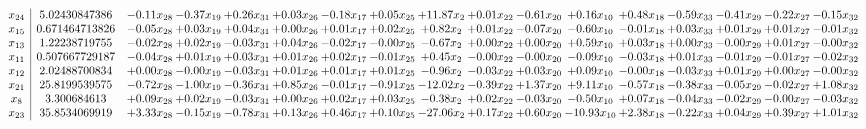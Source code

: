 \documentclass[9pt]{article}
\begin{document}
 \[\begin{array}{c| c c@{\hskip 2pt} c@{\hskip 2pt} c@{\hskip 2pt} c@{\hskip 2pt} c@{\hskip 2pt} c@{\hskip 2pt} c@{\hskip 2pt} c@{\hskip 2pt} c@{\hskip 2pt} c@{\hskip 2pt} c@{\hskip 2pt} c@{\hskip 2pt} c@{\hskip 2pt} c@{\hskip 2pt} c@{\hskip 2pt} }
 x_{24}   &  5.02430847386 & -0.11 x_{28} & -0.37 x_{19} & +  0.26 x_{31} & +  0.03 x_{26} & -0.18 x_{17} & +  0.05 x_{25} & + 11.87 x_{2} & +  0.01 x_{22} & -0.61 x_{20} & +  0.16 x_{10} & +  0.48 x_{18} & -0.59 x_{33} & -0.41 x_{29} & -0.22 x_{27} & -0.15 x_{32}\\
 x_{15}   &  0.671464713826 & -0.05 x_{28} & +  0.03 x_{19} & +  0.04 x_{31} & +  0.00 x_{26} & +  0.01 x_{17} & +  0.02 x_{25} & +  0.82 x_{2} & +  0.01 x_{22} & -0.07 x_{20} & -0.60 x_{10} & -0.01 x_{18} & +  0.03 x_{33} & +  0.01 x_{29} & +  0.01 x_{27} & -0.01 x_{32}\\
 x_{13}   &  1.22238719755 & -0.02 x_{28} & +  0.02 x_{19} & -0.03 x_{31} & +  0.04 x_{26} & -0.02 x_{17} & -0.00 x_{25} & -0.67 x_{2} & +  0.00 x_{22} & +  0.00 x_{20} & +  0.59 x_{10} & +  0.03 x_{18} & +  0.00 x_{33} & -0.00 x_{29} & +  0.01 x_{27} & -0.00 x_{32}\\
 x_{11}   &  0.507667729187 & -0.04 x_{28} & +  0.01 x_{19} & +  0.03 x_{31} & +  0.01 x_{26} & +  0.02 x_{17} & -0.01 x_{25} & +  0.45 x_{2} & -0.00 x_{22} & -0.00 x_{20} & -0.09 x_{10} & -0.03 x_{18} & +  0.01 x_{33} & -0.01 x_{29} & -0.01 x_{27} & -0.02 x_{32}\\
 x_{12}   &  2.02488700834 & +  0.00 x_{28} & -0.00 x_{19} & -0.03 x_{31} & +  0.01 x_{26} & +  0.01 x_{17} & +  0.01 x_{25} & -0.96 x_{2} & -0.03 x_{22} & +  0.03 x_{20} & +  0.09 x_{10} & -0.00 x_{18} & -0.03 x_{33} & +  0.01 x_{29} & +  0.00 x_{27} & -0.00 x_{32}\\
 x_{21}   &  25.8199539575 & -0.72 x_{28} & -1.00 x_{19} & -0.36 x_{31} & +  0.85 x_{26} & -0.01 x_{17} & -0.91 x_{25} & -12.02 x_{2} & -0.39 x_{22} & +  1.37 x_{20} & +  9.11 x_{10} & -0.57 x_{18} & -0.38 x_{33} & -0.05 x_{29} & -0.02 x_{27} & +  1.08 x_{32}\\
 x_{8}   &  3.300684613 & +  0.09 x_{28} & +  0.02 x_{19} & -0.03 x_{31} & +  0.00 x_{26} & +  0.02 x_{17} & +  0.03 x_{25} & -0.38 x_{2} & +  0.02 x_{22} & -0.03 x_{20} & -0.50 x_{10} & +  0.07 x_{18} & -0.04 x_{33} & -0.02 x_{29} & -0.00 x_{27} & -0.03 x_{32}\\
 x_{23}   &  35.8534069919 & +  3.33 x_{28} & -0.15 x_{19} & -0.78 x_{31} & +  0.13 x_{26} & +  0.46 x_{17} & +  0.10 x_{25} & -27.06 x_{2} & +  0.17 x_{22} & +  0.60 x_{20} & -10.93 x_{10} & +  2.38 x_{18} & -0.22 x_{33} & +  0.04 x_{29} & +  0.39 x_{27} & +  1.01 x_{32}\\

\end{array}\]
\end{document}

